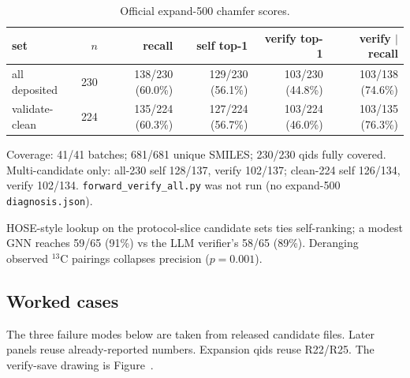 \begin{table}[ht]
\caption{Official expand-500 chamfer scores.}
\centering
\scriptsize
\setlength{\tabcolsep}{3pt}
\begin{tabular}{@{}lrrrrr@{}}
\toprule
set & $n$ & recall & self top-1 & verify top-1 & verify $|$ recall \\
\midrule
all deposited & 230 & 138/230 (60.0\%) & 129/230 (56.1\%) & 103/230 (44.8\%) & 103/138 (74.6\%) \\
validate-clean & 224 & 135/224 (60.3\%) & 127/224 (56.7\%) & 103/224 (46.0\%) & 103/135 (76.3\%) \\
\bottomrule
\end{tabular}
\end{table}

Coverage: 41/41 batches; 681/681 unique SMILES; 230/230 qids fully
covered. Multi-candidate only: all-230 self 128/137, verify 102/137;
clean-224 self 126/134, verify 102/134.
\texttt{forward\_\allowbreak verify\_\allowbreak all.py} was not run (no expand-500
\texttt{diagnosis.json}).

HOSE-style lookup on the protocol-slice candidate sets ties
self-ranking; a modest GNN reaches 59/65 (91\%) vs the LLM verifier's
58/65 (89\%).
Deranging observed $^{13}$C pairings collapses precision ($p{=}0.001$).

\subsection{Worked cases}
\label{si:cases}

The three failure modes below are taken from released candidate files.
Later panels reuse already-reported numbers.
Expansion qids reuse R22/R25.
The verify-save drawing is Figure~.

